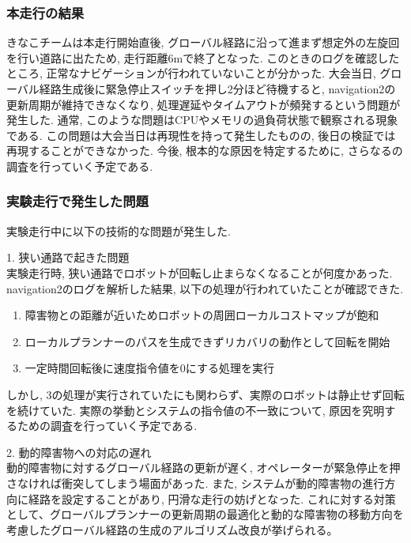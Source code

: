 \subsubsection{本走行の結果}
きなこチームは本走行開始直後, グローバル経路に沿って進まず想定外の左旋回を行い道路に出たため, 走行距離6mで終了となった. 
このときのログを確認したところ, 正常なナビゲーションが行われていないことが分かった. 
大会当日, グローバル経路生成後に緊急停止スイッチを押し2分ほど待機すると, navigation2の更新周期が維持できなくなり, 処理遅延やタイムアウトが頻発するという問題が発生した. 
通常, このような問題はCPUやメモリの過負荷状態で観察される現象である. 
この問題は大会当日は再現性を持って発生したものの, 後日の検証では再現することができなかった. 
今後, 根本的な原因を特定するために, さらなるの調査を行っていく予定である. 

\subsubsection{実験走行で発生した問題}
実験走行中に以下の技術的な問題が発生した. 

1. 狭い通路で起きた問題\\
実験走行時, 狭い通路でロボットが回転し止まらなくなることが何度かあった. 
navigation2のログを解析した結果, 以下の処理が行われていたことが確認できた. 

\begin{enumerate}
  \item 障害物との距離が近いためロボットの周囲ローカルコストマップが飽和
  \item ローカルプランナーのパスを生成できずリカバリの動作として回転を開始
  \item  一定時間回転後に速度指令値を0にする処理を実行
\end{enumerate}

しかし, 3の処理が実行されていたにも関わらず、実際のロボットは静止せず回転を続けていた. 
実際の挙動とシステムの指令値の不一致について, 原因を究明するための調査を行っていく予定である. 

2. 動的障害物への対応の遅れ\\
動的障害物に対するグローバル経路の更新が遅く, オペレーターが緊急停止を押さなければ衝突してしまう場面があった. 
また, システムが動的障害物の進行方向に経路を設定することがあり, 円滑な走行の妨げとなった. 
これに対する対策として、グローバルプランナーの更新周期の最適化と動的な障害物の移動方向を考慮したグローバル経路の生成のアルゴリズム改良が挙げられる。
